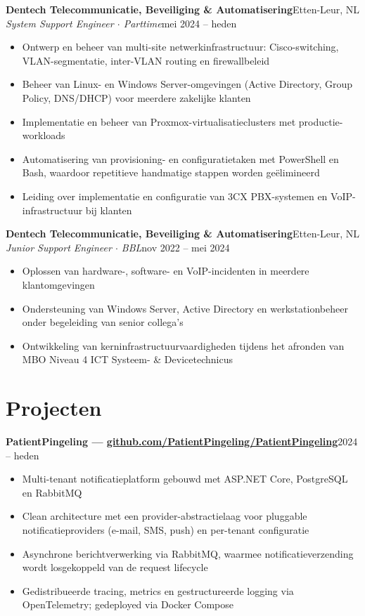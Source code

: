 \documentclass[a4paper,10pt]{article}
\newcommand{\cventry}[4]{%
  {\textbf{#1}}\hfill{\small\color{lightgray}#2}\\
  {\textit{#3}}\hfill{\small\color{lightgray}#4}\vspace{2pt}%
}
\newcommand{\cvsimple}[2]{%
  {\textbf{#1}}\hfill{\small\color{lightgray}#2}\vspace{1pt}%
}
\begin{document}
\cventry{Dentech Telecommunicatie, Beveiliging \& Automatisering}{Etten-Leur, NL}%
        {System Support Engineer $\cdot$ Parttime}{mei 2024 -- heden}
\begin{itemize}
  \item Ontwerp en beheer van multi-site netwerkinfrastructuur: Cisco-switching, VLAN-segmentatie, inter-VLAN routing en firewallbeleid
  \item Beheer van Linux- en Windows Server-omgevingen (Active Directory, Group Policy, DNS/DHCP) voor meerdere zakelijke klanten
  \item Implementatie en beheer van Proxmox-virtualisatieclusters met productie-workloads
  \item Automatisering van provisioning- en configuratietaken met PowerShell en Bash, waardoor repetitieve handmatige stappen worden geëlimineerd
  \item Leiding over implementatie en configuratie van 3CX PBX-systemen en VoIP-infrastructuur bij klanten
\end{itemize}

\vspace{4pt}

\cventry{Dentech Telecommunicatie, Beveiliging \& Automatisering}{Etten-Leur, NL}%
        {Junior Support Engineer $\cdot$ BBL}{nov 2022 -- mei 2024}
\begin{itemize}
  \item Oplossen van hardware-, software- en VoIP-incidenten in meerdere klantomgevingen
  \item Ondersteuning van Windows Server, Active Directory en werkstationbeheer onder begeleiding van senior collega's
  \item Ontwikkeling van kerninfrastructuurvaardigheden tijdens het afronden van MBO Niveau 4 ICT Systeem- \& Devicetechnicus
\end{itemize}

\section{Projecten}

\cvsimple{PatientPingeling \textnormal{\small\color{lightgray}--- \href{https://github.com/PatientPingeling/PatientPingeling}{github.com/PatientPingeling/PatientPingeling}}}{2024 -- heden}
\begin{itemize}
  \item Multi-tenant notificatieplatform gebouwd met ASP.NET Core, PostgreSQL en RabbitMQ
  \item Clean architecture met een provider-abstractielaag voor pluggable notificatieproviders (e-mail, SMS, push) en per-tenant configuratie
  \item Asynchrone berichtverwerking via RabbitMQ, waarmee notificatieverzending wordt losgekoppeld van de request lifecycle
  \item Gedistribueerde tracing, metrics en gestructureerde logging via OpenTelemetry; gedeployed via Docker Compose
\end{itemize}
\end{document}
